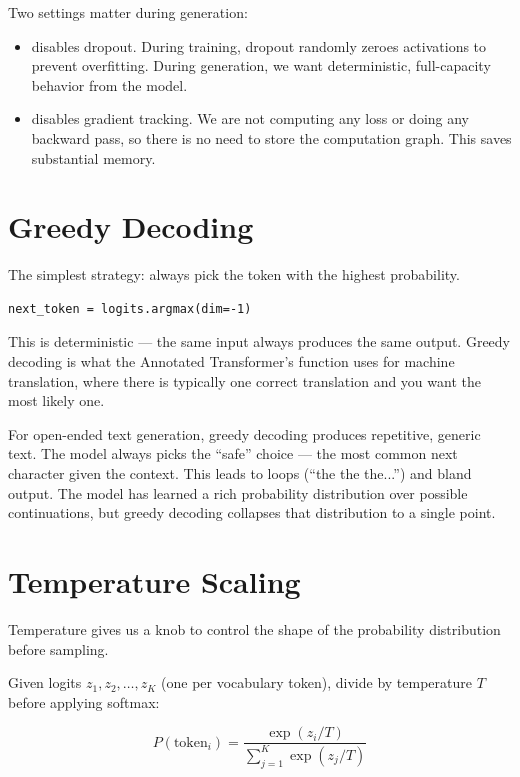 Two settings matter during generation:

\begin{itemize}
  \item \textbf{} disables dropout. During training, dropout randomly zeroes activations to prevent overfitting. During generation, we want deterministic, full-capacity behavior from the model.
  \item \textbf{} disables gradient tracking. We are not computing any loss or doing any backward pass, so there is no need to store the computation graph. This saves substantial memory.
\end{itemize}

\section{Greedy Decoding}

The simplest strategy: always pick the token with the highest probability.

\concepttag
\begin{lstlisting}
next_token = logits.argmax(dim=-1)
\end{lstlisting}

This is deterministic --- the same input always produces the same output. Greedy decoding is what the Annotated Transformer's  function uses for machine translation, where there is typically one correct translation and you want the most likely one.

For open-ended text generation, greedy decoding produces repetitive, generic text. The model always picks the ``safe'' choice --- the most common next character given the context. This leads to loops (``the the the...'') and bland output. The model has learned a rich probability distribution over possible continuations, but greedy decoding collapses that distribution to a single point.

\section{Temperature Scaling}

Temperature gives us a knob to control the shape of the probability distribution before sampling.

Given logits $z_1, z_2, \ldots, z_K$ (one per vocabulary token), divide by temperature $T$ before applying softmax:

\[P(\text{token}_i) = \frac{\exp(z_i / T)}{\sum_{j=1}^{K} \exp(z_j / T)}\]

